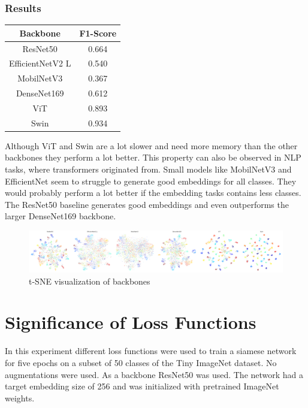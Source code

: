 \documentclass[12pt,a4paper]{report}
\begin{document}
\subsubsection*{Results}
\begin{table}
	\begin{tabular}{ | c | c | }
		\hline
		Backbone & F1-Score \\ 
		\hline
		ResNet50 & 0.664 \\ 
		\hline
		EfficientNetV2 L & 0.540 \\ 
		\hline
		MobilNetV3 & 0.367 \\ 
		\hline
		DenseNet169 & 0.612 \\ 
		\hline
		ViT & 0.893 \\ 
		\hline
		Swin & 0.934 \\ 
		\hline
	\end{tabular}
\end{table} 
Although ViT and Swin are a lot slower and need more memory than the other backbones they perform a lot better.
This property can also be observed in NLP tasks, where transformers originated from.
Small models like MobilNetV3 and EfficientNet seem to struggle to generate good embeddings for all classes.
They would probably perform a lot better if the embedding tasks contains less classes.
The ResNet50 baseline generates good embeddings and even outperforms the larger DenseNet169 backbone.

\begin{figure}[h]
	\centering
	\includegraphics[width=\textwidth]{../plots/backbones.png}
	\caption{t-SNE visualization of backbones}
\end{figure}

\newpage

\section{Significance of Loss Functions}

In this experiment different loss functions were used to train a siamese network for five epochs on a subset of 50 classes of the Tiny ImageNet dataset.
No augmentations were used.
As a backbone ResNet50 was used.
The network had a target embedding size of 256 and was initialized with pretrained ImageNet weights.
\end{document}

